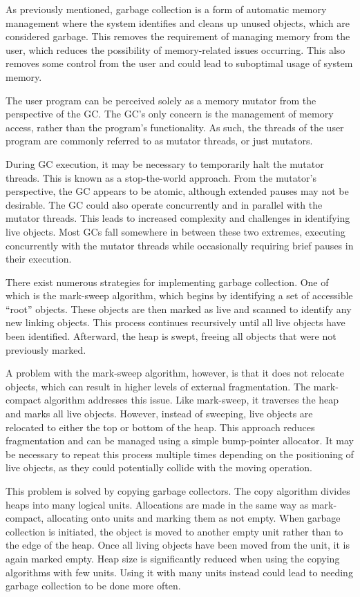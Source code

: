 As previously mentioned, garbage collection is a form of automatic memory management where the system identifies and cleans up unused objects, which are considered garbage. This removes the requirement of managing memory from the user, which reduces the possibility of memory-related issues occurring. This also removes some control from the user and could lead to suboptimal usage of system memory.

The user program can be perceived solely as a memory mutator from the perspective of the GC. The GC's only concern is the management of memory access, rather than the program's functionality. As such, the threads of the user program are commonly referred to as mutator threads, or just mutators.

During GC execution, it may be necessary to temporarily halt the mutator threads. This is known as a stop-the-world approach. From the mutator's perspective, the GC appears to be atomic, although extended pauses may not be desirable. The GC could also operate concurrently and in parallel with the mutator threads. This leads to increased complexity and challenges in identifying live objects. Most GCs fall somewhere in between these two extremes, executing concurrently with the mutator threads while occasionally requiring brief pauses in their execution.

There exist numerous strategies for implementing garbage collection. One of which is the mark-sweep algorithm, which begins by identifying a set of accessible ``root'' objects. These objects are then marked as live and scanned to identify any new linking objects. This process continues recursively until all live objects have been identified. Afterward, the heap is swept, freeing all objects that were not previously marked.

A problem with the mark-sweep algorithm, however, is that it does not relocate objects, which can result in higher levels of external fragmentation. The mark-compact algorithm addresses this issue. Like mark-sweep, it traverses the heap and marks all live objects. However, instead of sweeping, live objects are relocated to either the top or bottom of the heap. This approach reduces fragmentation and can be managed using a simple bump-pointer allocator. It may be necessary to repeat this process multiple times depending on the positioning of live objects, as they could potentially collide with the moving operation.

This problem is solved by copying garbage collectors. The copy algorithm divides heaps into many logical units. Allocations are made in the same way as mark-compact, allocating onto units and marking them as not empty. When garbage collection is initiated, the object is moved to another empty unit rather than to the edge of the heap. Once all living objects have been moved from the unit, it is again marked empty. Heap size is significantly reduced when using the copying algorithms with few units. Using it with many units instead could lead to needing garbage collection to be done more often.

